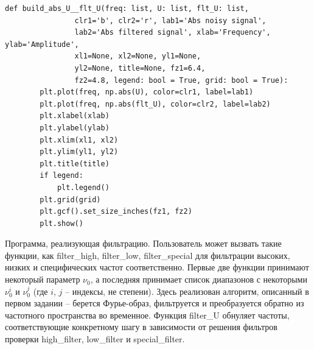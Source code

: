 \documentclass[a4paper, 12pt]{article}
\begin{document}
\begin{lstlisting}[label=l3, caption={Файл builder.py. Реализация построения графиков.}]
    def build_abs_U__flt_U(freq: list, U: list, flt_U: list,
                clr1='b', clr2='r', lab1='Abs noisy signal',
                lab2='Abs filtered signal', xlab='Frequency', ylab='Amplitude',
                xl1=None, xl2=None, yl1=None, 
                yl2=None, title=None, fz1=6.4, 
                fz2=4.8, legend: bool = True, grid: bool = True):
        plt.plot(freq, np.abs(U), color=clr1, label=lab1)
        plt.plot(freq, np.abs(flt_U), color=clr2, label=lab2)
        plt.xlabel(xlab)
        plt.ylabel(ylab)
        plt.xlim(xl1, xl2)
        plt.ylim(yl1, yl2)
        plt.title(title)
        if legend:
            plt.legend()
        plt.grid(grid)
        plt.gcf().set_size_inches(fz1, fz2)
        plt.show()
    \end{lstlisting}


    Программа, реализующая фильтрацию. Пользователь может вызвать такие функции, как filter\_{high}, filter\_{low}, filter\_{special}
    для фильтрации высоких, низких и специфических частот соответственно. Первые две функции принимают некоторый параметр
    $\nu_0$, а последняя принимает список диапазонов с некоторыми $\nu_{0}^{i}$ и $\nu_{0}^{j}$ (где $i,\,j$ -- индексы, не степени).
    Здесь реализован алгоритм, описанный в первом задании -- берется Фурье-образ, фильтруется и преобразуется обратно из частотного
    пространства во временное. Функция filter\_{U} обнуляет частоты, соответствующие конкретному шагу в зависимости от решения фильтров
    проверки high\_{filter}, low\_{filter} и special\_{filter}.
\end{document}
